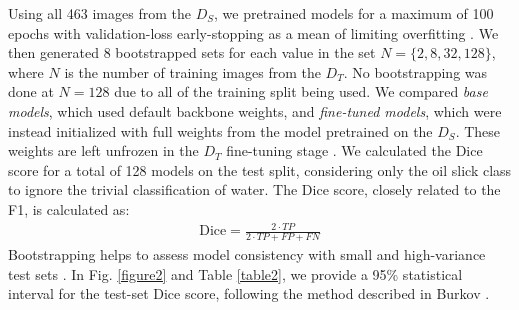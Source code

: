 \documentclass[journal]{IEEEtran}
\begin{document}
Using all 463 images from the $\mathit{D}_S$, we pretrained models for a maximum of 100 epochs with validation-loss early-stopping as a mean of limiting overfitting \cite{wangGeneralizingFewExamples2020}. 
We then generated 8 bootstrapped sets for each value in the set \( N = \{ 2, 8, 32, 128\} \), where \( N \) is the number of 
training images from the $\mathit{D}_T$. No bootstrapping was done at \( N = 128 \) due to all of the training split being used. We compared \textit{base models}, which used
default backbone weights, and \textit{fine-tuned models}, which were instead initialized with full weights from the model pretrained on the $\mathit{D}_S$. These weights are left unfrozen in the $\mathit{D}_T$ 
fine-tuning stage \cite{yosinskiHowTransferableAre2014}. We calculated the Dice score for a total of 128 models on the test split, considering only the oil slick class to ignore the trivial classification of water. 
The Dice score, closely related to the F1, is calculated as:
\begin{align}
    \text{Dice} = \frac{2 \cdot TP}{2 \cdot TP + FP + FN}
\end{align}
Bootstrapping helps to assess model consistency with small and high-variance test sets \cite{mollersenAccountingMultiplicityMachine2024}. In Fig. \ref{figure2} and Table \ref{table2},
we provide a 95\% statistical interval for the test-set Dice score, following the method described in Burkov \cite{burkovMachineLearningEngineering2020}.
\end{document}
